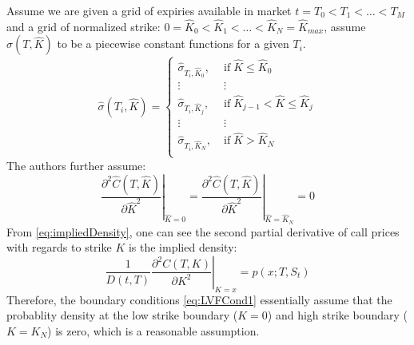 \documentclass[letterpaper,12pt,titlepage,oneside,final]{book}
\numberwithin{equation}{section}
\theoremstyle{definition}
\begin{document}
Assume we are given a grid of expiries available in market $t=T_0 < T_1 < \dots< T_{M} $ and  a grid of normalized strike: $0=\widehat{K}_0<\widehat{K}_1<\dots<\widehat{K}_{N}=\widehat{K}_{max}$, \citet{andreasen2010volatility} assume $\widehat{\sigma}(T,\widehat{K})$  to be a piecewise constant functions for a given $T_i$.
\begin{equation}
\widehat{\sigma}(T_i,\widehat{K})=\left\{ \begin{array}{ll}
\widehat{\sigma}_{T_i,\widehat{K}_0}  , \; &\text{if} \; \widehat{K} \leq \widehat{K}_0\\
\vdots & \vdots\\
\widehat{\sigma}_{T_i,\widehat{K}_j}  , \; &\text{if} \; \widehat{K}_{j-1}<\widehat{K} \leq \widehat{K}_j\\
\vdots & \vdots\\
\widehat{\sigma}_{T_i,\widehat{K}_{N}} , \; &\text{if} \;  \widehat{K} > \widehat{K}_{N} \\
\end{array} \right.
\label{eq:LVFVolDef}
\end{equation}
The authors further assume:
\begin{equation}
\left. \frac{\partial^2 \widehat{C}(T,\widehat{K})}{ \partial \widehat{K}^2}\right\vert_{\widehat{K}=0}=\left. \frac{\partial^2 \widehat{C}(T,\widehat{K})}{ \partial \widehat{K}^2}\right\vert_{\widehat{K}=\widehat{K}_{N}}=0
\label{eq:LVFCond1}
\end{equation}
From \eqref{eq:impliedDensity}, one can see the second partial derivative of call prices with regards to strike $K$ is the implied density:
\[
\frac{1}{D(t,T)} \left. \frac{\partial^2 C(T,K)}{\partial K^2} \right\vert_{K=x}=	p(x;T,S_t) 
\]
Therefore, the boundary conditions \eqref{eq:LVFCond1} essentially assume that the probablity density at the  low strike boundary ($K=0$) and  high strike boundary ($K=K_{N}$) is zero, which is a reasonable assumption.
\end{document}
